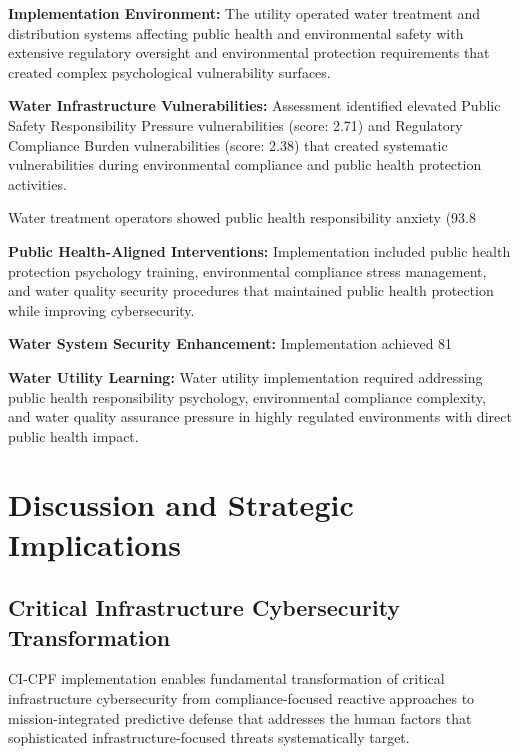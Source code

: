 \documentclass[10pt, twocolumn]{article}
\begin{document}
\textbf{Implementation Environment:} The utility operated water treatment and distribution systems affecting public health and environmental safety with extensive regulatory oversight and environmental protection requirements that created complex psychological vulnerability surfaces.

\textbf{Water Infrastructure Vulnerabilities:} Assessment identified elevated Public Safety Responsibility Pressure vulnerabilities (score: 2.71) and Regulatory Compliance Burden vulnerabilities (score: 2.38) that created systematic vulnerabilities during environmental compliance and public health protection activities.

Water treatment operators showed public health responsibility anxiety (93.8%

\textbf{Public Health-Aligned Interventions:} Implementation included public health protection psychology training, environmental compliance stress management, and water quality security procedures that maintained public health protection while improving cybersecurity.

\textbf{Water System Security Enhancement:} Implementation achieved 81%

\textbf{Water Utility Learning:} Water utility implementation required addressing public health responsibility psychology, environmental compliance complexity, and water quality assurance pressure in highly regulated environments with direct public health impact.

\section{Discussion and Strategic Implications}

\subsection{Critical Infrastructure Cybersecurity Transformation}

CI-CPF implementation enables fundamental transformation of critical infrastructure cybersecurity from compliance-focused reactive approaches to mission-integrated predictive defense that addresses the human factors that sophisticated infrastructure-focused threats systematically target.
\end{document}
